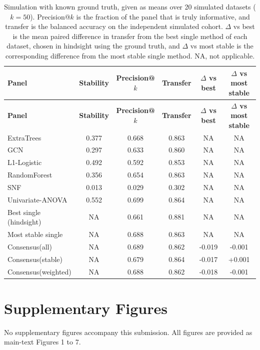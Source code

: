\documentclass[utf8]{frontiers_suppmat}
\begin{document}
\begin{longtable}{lccccc}
\caption{Simulation with known ground truth, given as means over 20 simulated datasets ($k = 50$). Precision@$k$ is the fraction of the panel that is truly informative, and transfer is the balanced accuracy on the independent simulated cohort. $\Delta$ vs best is the mean paired difference in transfer from the best single method of each dataset, chosen in hindsight using the ground truth, and $\Delta$ vs most stable is the corresponding difference from the most stable single method. NA, not applicable.}\label{tab:S6}\\
\hline
\textbf{Panel} & \textbf{Stability} & \textbf{Precision@$k$} & \textbf{Transfer} & \textbf{$\Delta$ vs best} & \textbf{$\Delta$ vs most stable} \\
\hline
\endfirsthead
\hline
\textbf{Panel} & \textbf{Stability} & \textbf{Precision@$k$} & \textbf{Transfer} & \textbf{$\Delta$ vs best} & \textbf{$\Delta$ vs most stable} \\
\hline
\endhead
\hline
\endfoot
ExtraTrees & 0.377 & 0.668 & 0.863 & NA & NA \\
GCN & 0.297 & 0.633 & 0.860 & NA & NA \\
L1-Logistic & 0.492 & 0.592 & 0.853 & NA & NA \\
RandomForest & 0.356 & 0.654 & 0.863 & NA & NA \\
SNF & 0.013 & 0.029 & 0.302 & NA & NA \\
Univariate-ANOVA & 0.552 & 0.699 & 0.864 & NA & NA \\
Best single (hindsight) & NA & 0.661 & 0.881 & NA & NA \\
Most stable single & NA & 0.688 & 0.863 & NA & NA \\
Consensus(all) & NA & 0.689 & 0.862 & -0.019 & -0.001 \\
Consensus(stable) & NA & 0.679 & 0.864 & -0.017 & +0.001 \\
Consensus(weighted) & NA & 0.688 & 0.862 & -0.018 & -0.001 \\
\end{longtable}

\normalsize

\section{Supplementary Figures}

No supplementary figures accompany this submission. All figures are provided as main-text Figures 1 to 7.
\end{document}
